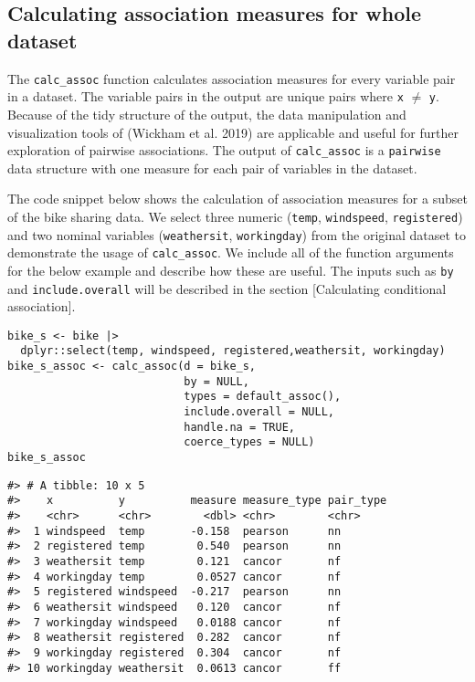 \hypertarget{calculating-association-measures-for-whole-dataset}{%
\subsection{Calculating association measures for whole dataset}\label{calculating-association-measures-for-whole-dataset}}

The \texttt{calc\_assoc} function calculates association measures for every variable pair in a dataset. The variable pairs in the output are unique pairs where \texttt{x} \(\neq\) \texttt{y}. Because of the tidy structure of the output, the data manipulation and visualization tools of  (Wickham et al. 2019) are applicable and useful for further exploration of pairwise associations. The output of \texttt{calc\_assoc} is a \texttt{pairwise} data structure with one measure for each pair of variables in the dataset.

The code snippet below shows the calculation of association measures for a subset of the bike sharing data. We select three numeric (\texttt{temp}, \texttt{windspeed}, \texttt{registered}) and two nominal variables (\texttt{weathersit}, \texttt{workingday}) from the original dataset to demonstrate the usage of \texttt{calc\_assoc}. We include all of the function arguments for the below example and describe how these are useful. The inputs such as \texttt{by} and \texttt{include.overall} will be described in the section {[}Calculating conditional association{]}.

\begin{verbatim}
bike_s <- bike |> 
  dplyr::select(temp, windspeed, registered,weathersit, workingday)
bike_s_assoc <- calc_assoc(d = bike_s,
                           by = NULL,
                           types = default_assoc(),
                           include.overall = NULL,
                           handle.na = TRUE,
                           coerce_types = NULL)
bike_s_assoc
\end{verbatim}

\begin{verbatim}
#> # A tibble: 10 x 5
#>    x          y          measure measure_type pair_type
#>    <chr>      <chr>        <dbl> <chr>        <chr>    
#>  1 windspeed  temp       -0.158  pearson      nn       
#>  2 registered temp        0.540  pearson      nn       
#>  3 weathersit temp        0.121  cancor       nf       
#>  4 workingday temp        0.0527 cancor       nf       
#>  5 registered windspeed  -0.217  pearson      nn       
#>  6 weathersit windspeed   0.120  cancor       nf       
#>  7 workingday windspeed   0.0188 cancor       nf       
#>  8 weathersit registered  0.282  cancor       nf       
#>  9 workingday registered  0.304  cancor       nf       
#> 10 workingday weathersit  0.0613 cancor       ff
\end{verbatim}

